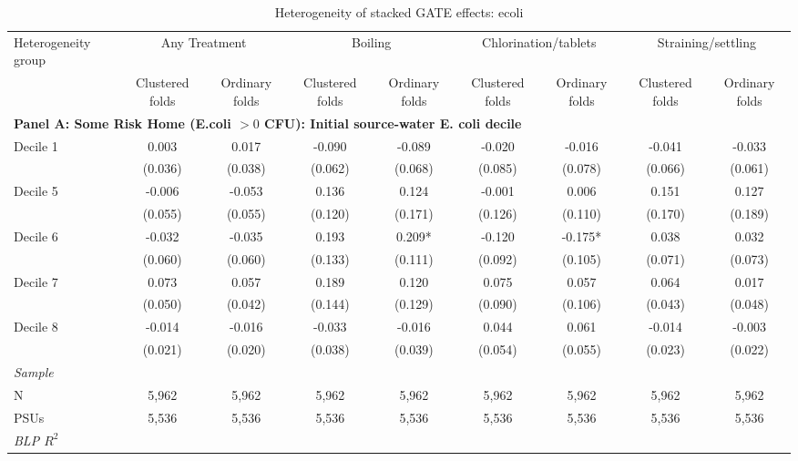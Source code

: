 \begin{landscape}
\begin{table}[p]
\centering
\caption{Heterogeneity of stacked GATE effects: ecoli}
\label{tab:table_heterogeneity_appendix-ecoli}
\scriptsize\setlength{\tabcolsep}{4pt}
\begin{adjustbox}{max width=\linewidth, center}
\begin{tabular}{lcccccccc}
\toprule
Heterogeneity group & \multicolumn{2}{c}{Any Treatment} & \multicolumn{2}{c}{Boiling} & \multicolumn{2}{c}{Chlorination/tablets} & \multicolumn{2}{c}{Straining/settling} \\
 & Clustered folds & Ordinary folds & Clustered folds & Ordinary folds & Clustered folds & Ordinary folds & Clustered folds & Ordinary folds \\
\midrule
\multicolumn{9}{l}{\textbf{Panel A: Some Risk Home (E.coli $>0$ CFU): Initial source-water E. coli decile}} \\
Decile 1 & 0.003 & 0.017 & -0.090 & -0.089 & -0.020 & -0.016 & -0.041 & -0.033 \\
 & (0.036) & (0.038) & (0.062) & (0.068) & (0.085) & (0.078) & (0.066) & (0.061) \\
Decile 5 & -0.006 & -0.053 & 0.136 & 0.124 & -0.001 & 0.006 & 0.151 & 0.127 \\
 & (0.055) & (0.055) & (0.120) & (0.171) & (0.126) & (0.110) & (0.170) & (0.189) \\
Decile 6 & -0.032 & -0.035 & 0.193 & 0.209* & -0.120 & -0.175* & 0.038 & 0.032 \\
 & (0.060) & (0.060) & (0.133) & (0.111) & (0.092) & (0.105) & (0.071) & (0.073) \\
Decile 7 & 0.073 & 0.057 & 0.189 & 0.120 & 0.075 & 0.057 & 0.064 & 0.017 \\
 & (0.050) & (0.042) & (0.144) & (0.129) & (0.090) & (0.106) & (0.043) & (0.048) \\
Decile 8 & -0.014 & -0.016 & -0.033 & -0.016 & 0.044 & 0.061 & -0.014 & -0.003 \\
 & (0.021) & (0.020) & (0.038) & (0.039) & (0.054) & (0.055) & (0.023) & (0.022) \\
\multicolumn{9}{l}{\textit{Sample}} \\
\quad N & 5,962 & 5,962 & 5,962 & 5,962 & 5,962 & 5,962 & 5,962 & 5,962 \\
\quad PSUs & 5,536 & 5,536 & 5,536 & 5,536 & 5,536 & 5,536 & 5,536 & 5,536 \\
\multicolumn{9}{l}{\textit{BLP $R^{2}$}} \\

\end{tabular}
\end{adjustbox}
\end{table}
\end{landscape}
